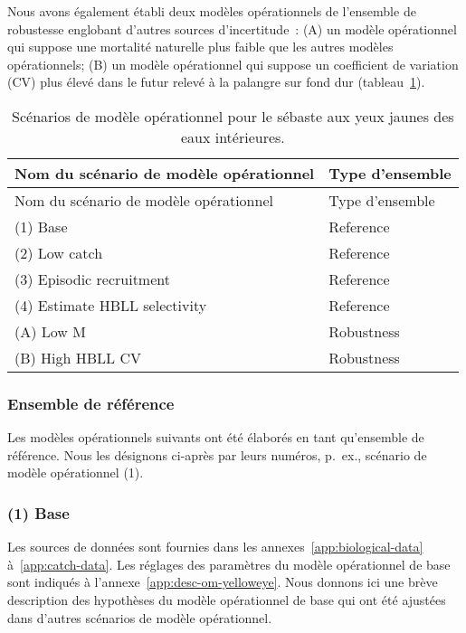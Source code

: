 \documentclass[11pt]{book}
\begin{document}
Nous avons également établi deux modèles opérationnels de l'ensemble de robustesse englobant d'autres sources d'incertitude~: (A) un modèle opérationnel qui suppose une mortalité naturelle plus faible que les autres modèles opérationnels; (B) un modèle opérationnel qui suppose un coefficient de variation (CV) plus élevé dans le futur relevé à la palangre sur fond dur (tableau~\ref{tab:ye-scen}).
\begin{longtable}[]{@{}ll@{}}
\caption{\label{tab:ye-scen}Scénarios de modèle opérationnel pour le sébaste aux yeux jaunes des eaux intérieures.}\tabularnewline
\toprule
Nom du scénario de modèle opérationnel & Type d'ensemble \\
\midrule
\endfirsthead
\toprule
Nom du scénario de modèle opérationnel & Type d'ensemble \\
\midrule
\endhead
(1) Base & Reference \\
(2) Low catch & Reference \\
(3) Episodic recruitment & Reference \\
(4) Estimate HBLL selectivity & Reference \\
(A) Low M & Robustness \\
(B) High HBLL CV & Robustness \\
\bottomrule
\end{longtable}
\hypertarget{sec:approach3-reference}{%
\subsubsection{Ensemble de référence}\label{sec:approach3-reference}}

Les modèles opérationnels suivants ont été élaborés en tant qu'ensemble de référence. Nous les désignons ci-après par leurs numéros, p.~ex., scénario de modèle opérationnel (1).

\hypertarget{sec:approach3-reference1}{%
\subsubsection{(1) Base}\label{sec:approach3-reference1}}

Les sources de données sont fournies dans les annexes~\ref{app:biological-data} à~\ref{app:catch-data}. Les réglages des paramètres du modèle opérationnel de base sont indiqués à l'annexe~\ref{app:desc-om-yelloweye}. Nous donnons ici une brève description des hypothèses du modèle opérationnel de base qui ont été ajustées dans d'autres scénarios de modèle opérationnel.
\end{document}
